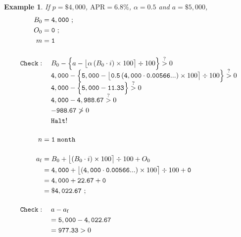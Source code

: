\documentclass[12pt,letterpaper,oneside]{article}
\newtheorem{example}{Example}[section]
\theoremstyle{remark} %
\begin{document}
	\renewcommand{\rate}{0.00566...}
	\renewcommand{\proportion}{0.5}
	\renewcommand{\amount}{5,000}
	\renewcommand{\balance}{4,000}
	\renewcommand{\interest}{0}
	\renewcommand{\months}{0}
	\renewcommand{\monthsp}{1}
	\renewcommand{\balanceitf}{\balance}
	\renewcommand{\interestitf}{\interest}
	\renewcommand{\monthsitf}{\months}%
	\renewcommand{\monthspitf}{\monthsp}%
	\renewcommand{\amountfinal}{4,022.67}
	\begin{example}
	If $p=\$4,000$, $\mbox{APR}=6.8\%$, $\alpha=0.5$ and $a=\$5,000$,
	\footnotesize
	\begin{align*}
	B_{0}&=\mathtt{\balance}\ ;\\
	O_{0}&=\mathtt{\interest}\ ;\\
	m&=\mathtt{\monthsp}\\[12pt]
	\mathtt{Check:}&\quad\;B_{\months}-\Big\{a-\big\lfloor{\alpha\left(B_{\months}\cdot i\right)\times 100}\big\rceil\div 100\Big\}\overset{?}{>}0\\[-6pt]
	&\quad\;\mathtt{\balance}-\Big\{\mathtt{\amount}-\big\lfloor{\mathtt{\proportion}\left(\mathtt{\balance}\cdot \mathtt{\rate}\right)\times 100}\big\rceil\div 100\Big\}\overset{?}{>}0\\[-6pt]
	&\quad\;\mathtt{\balance}-\Big\{\mathtt{\amount}-\mathtt{11.33}\Big\}\overset{?}{>}0\\[-6pt]
	&\quad\;\mathtt{\balance}-\mathtt{4,988.67}\overset{?}{>}0\\
	&\quad\;\mathtt{-988.67}\ngtr 0\\
	&\quad\;\mathtt{Halt!}\\[12pt]
	n&=\mathtt{\monthspitf\ month}\\[12pt]
	a_{\rm{f}}&=B_{\monthsitf}+\big\lfloor{\left(B_{\monthsitf}\cdot i\right)\times 100}\big\rceil\div 100+O_{\monthsitf}\\
	&=\mathtt{\balanceitf}+\big\lfloor{\left(\mathtt{\balanceitf}\cdot \mathtt{\rate}\right)\times 100}\big\rceil\div 100+\mathtt{\interestitf}\\
	&=\mathtt{\balanceitf}+\mathtt{22.67}+\mathtt{\interestitf}\\
	&=\mathtt{\$\amountfinal}\ ;\\[12pt]
	\mathtt{Check:}&\quad\;a-a_{\rm{f}}\\
	&\quad =\mathtt{\amount}-\mathtt{\amountfinal}\\
	&\quad =\mathtt{977.33}>0\\[12pt]

\end{align*}
\end{example}
\end{document}
